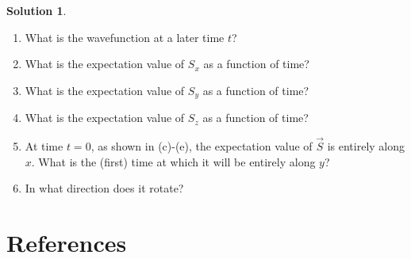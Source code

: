 \documentclass[10pt]{article}
\theoremstyle{definition}
\newtheorem{soln}{Solution}
\newcommand{\bv}[1]{\vec{#1}}
\begin{document}
\begin{soln}
\begin{enumerate}[label=(\alph*)]
$$\begin{pmatrix}
            \end{pmatrix}=\frac{\hbar}{2\sqrt{2}}\begin{pmatrix}
              1 \\-1
            \end{pmatrix}$$
            and so 
            $$\langle S_z\rangle=\frac{1}{\sqrt{2}}\begin{pmatrix}
              1 &1
            \end{pmatrix}\frac{\hbar}{2\sqrt{2}}\begin{pmatrix}
              1 \\-1
            \end{pmatrix}=0$$
    \item What is the wavefunction at a later time $t$?
    \item What is the expectation value of $S_x$ as a function of time?
    \item What is the expectation value of $S_y$ as a function of time?
    \item What is the expectation value of $S_z$ as a function of time?
    \item At time $t = 0$, as shown in (c)-(e), the expectation value of $\bv{S}$ is entirely along $x$. What
          is the (first) time at which it will be entirely along $y$?
    \item In what direction does it rotate?
  \end{enumerate}
\end{soln}

\section{References}
\printbibliography
\end{document}
